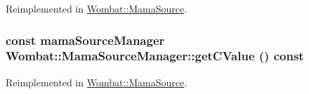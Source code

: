 Reimplemented in \hyperlink{classWombat_1_1MamaSource_a84f406ac743b6b1bbad5adfc8e14db3c}{Wombat::MamaSource}.\hypertarget{classWombat_1_1MamaSourceManager_aea217b2281827fd1d3abfb49062b8c46}{
\subsubsection[{getCValue}]{\setlength{\rightskip}{0pt plus 5cm}const mamaSourceManager Wombat::MamaSourceManager::getCValue () const}}
\label{classWombat_1_1MamaSourceManager_aea217b2281827fd1d3abfb49062b8c46}


Reimplemented in \hyperlink{classWombat_1_1MamaSource_a53b49953e08d89062dd97e476e1a2e02}{Wombat::MamaSource}.